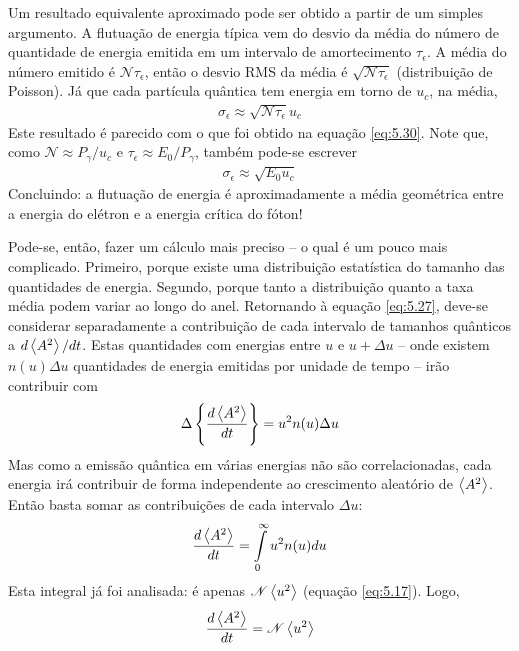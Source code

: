 Um resultado equivalente aproximado pode ser obtido a partir de um simples argumento. A flutuação de energia típica vem do desvio da média do número de quantidade de energia emitida em um intervalo de amortecimento $\tau_\epsilon$. A média do número emitido é $\mathscr{N}\tau_\epsilon$, então o desvio RMS da média é $\sqrt{\mathscr{N}\tau_\epsilon}$ (distribuição de Poisson). Já que cada partícula quântica tem energia em torno de $u_c$, na média,
\begin{align}
	\sigma_\epsilon \approx \sqrt{\mathscr{N}\tau_\epsilon}u_c
\end{align}
Este resultado é parecido com o que foi obtido na equação \eqref{eq:5.30}. Note que, como $\mathscr{N} \approx P_\gamma/u_c$ e $\tau_\epsilon \approx E_0/P_\gamma$, também pode-se escrever
\begin{align}
	\sigma_\epsilon \approx \sqrt{E_0 u_c}\label{eq:5.32}
\end{align}
Concluindo: a flutuação de energia é aproximadamente a média geométrica entre a energia do elétron e a energia crítica do fóton!

Pode-se, então, fazer um cálculo mais preciso -- o qual é um pouco mais complicado. Primeiro, porque existe uma distribuição estatística do tamanho das quantidades de energia. Segundo, porque tanto a distribuição quanto a taxa média podem variar ao longo do anel. Retornando à equação \eqref{eq:5.27}, deve-se considerar separadamente a contribuição de cada intervalo de tamanhos quânticos a $d\left< A^2 \right>/dt$. Estas quantidades com energias entre $u$ e $u+\Delta u$ -- onde existem $n(u)\Delta u$ quantidades de energia emitidas por unidade de tempo -- irão contribuir com
\begin{align}
	\Delta \left\{\frac{d\left< A^2 \right>}{dt}\right\} = u^2 n(u) \Delta u
\end{align}
Mas como a emissão quântica em várias energias não são correlacionadas, cada energia irá contribuir de forma independente ao crescimento aleatório de $\left< A^2 \right>$. Então basta somar as contribuições de cada intervalo $\Delta u$:
\begin{align}
	\frac{d\left< A^2 \right>}{dt} = \int\limits_{0}^{\infty}u^2n(u)du
\end{align}
Esta integral já foi analisada: é apenas $\mathscr{N}\left< u^2 \right>$ (equação \eqref{eq:5.17}). Logo,
\begin{align}
	\frac{d\left< A^2 \right>}{dt} = \mathscr{N}\left< u^2 \right>
\end{align}

